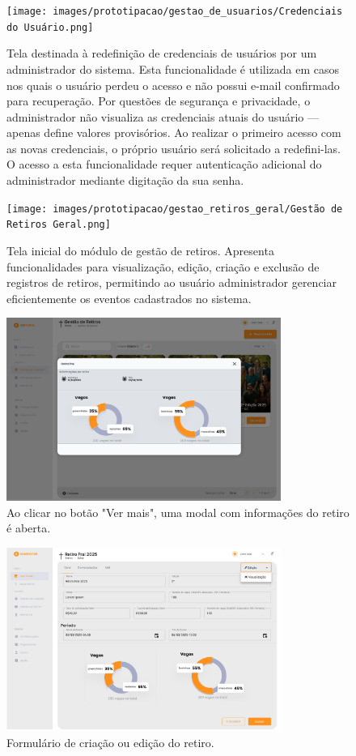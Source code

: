 \begin{figure}[H]
\centering
\texttt{[image: images/prototipacao/gestao\_de\_usuarios/Credenciais do Usuário.png]}
\caption{Tela destinada à redefinição de credenciais de usuários por um administrador do sistema. Esta funcionalidade é utilizada em casos nos quais o usuário perdeu o acesso e não possui e-mail confirmado para recuperação. Por questões de segurança e privacidade, o administrador não visualiza as credenciais atuais do usuário — apenas define valores provisórios. Ao realizar o primeiro acesso com as novas credenciais, o próprio usuário será solicitado a redefini-las. O acesso a esta funcionalidade requer autenticação adicional do administrador mediante digitação da sua senha.}
\end{figure}

\begin{figure}[H]
\centering
\texttt{[image: images/prototipacao/gestao\_retiros\_geral/Gestão de Retiros Geral.png]}
\caption{Tela inicial do módulo de gestão de retiros. Apresenta funcionalidades para visualização, edição, criação e exclusão de registros de retiros, permitindo ao usuário administrador gerenciar eficientemente os eventos cadastrados no sistema.}
\end{figure}

\begin{figure}[H]
\centering
\includegraphics[width=0.8\textwidth]{images/prototipacao/gestao_retiros_geral/Ver Mais Retiro.png}
\caption{Ao clicar no botão "Ver mais", uma modal com informações do retiro é aberta.}
\end{figure}

\begin{figure}[H]
\centering
\includegraphics[width=0.8\textwidth]{images/prototipacao/gestao_retiros_geral/Geral.png}
\caption{Formulário de criação ou edição do retiro.}
\end{figure}

